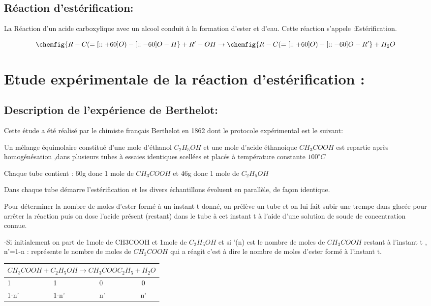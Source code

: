 \documentclass[12pt]{article}
\begin{document}
\subsection{Réaction d'estérification:}
La Réaction d'un acide carboxylique avec un alcool conduit à la formation d'ester et d'eau. Cette réaction s'appele :Estérification.


$$\chemfig{R-C(=[::+60]O)-[::-60]O-H} + R'-OH \rightarrow \chemfig{R-C(=[::+60]O)-[::-60]O-R'} + H_2O$$


\section{Etude expérimentale de la réaction d'estérification : }

\subsection{Description de l'expérience de Berthelot:}

Cette étude a été réalisé par le chimiste français Berthelot en 1862 dont le protocole expérimental est le suivant:

Un mélange équimolaire constitué d'une mole d'éthanol $C_2H_5OH$ et une mole d'acide éthanoique $CH_3COOH$ est
repartie après homogénésation ,dans plusieurs tubes à essaies identiques scellées et placés à température constante
$100^{\circ}C$

Chaque tube contient : 60g donc 1 mole de $CH_3COOH$ et 46g donc 1 mole de $C_2H_5OH$


Dans chaque tube démarre l'estérification et les divers échantillons évoluent en parallèle, de façon identique.

Pour déterminer la nombre de moles d'ester formé à un instant t donné, on prélève un tube et on lui fait subir une
trempe dans glacée pour arrêter la réaction puis on dose l’acide présent (restant) dans le tube à cet instant t à l’aide d’une solution de soude de concentration connue.

-Si initialement on part de 1mole de CH3COOH et 1mole de $C_2H_5OH$ et si  '(n) est le nombre de moles de $CH_3COOH$ restant à l'instant t , n'=1-n : représente le nombre de moles de $CH_3COOH$ qui a réagit c'est à dire le nombre de moles
d'ester formé à l'instant t.

\begin{center}
	\begin{tabular}{|p{2.2cm} |p{2.2cm} |p{4cm} |c|} 
 \hline
 \multicolumn{4}{|c|}{ $CH_3COOH + C_2H_5OH \rightarrow CH_3COOC_2H_5 + H_2O$} \\ 
 \hline\hline
 1 & 1 & 0 & 0 \\ 
 \hline
 1-n' &	1-n' & n' & n' \\
 \hline
  \hline
\end{tabular}
\end{center}
\end{document}
